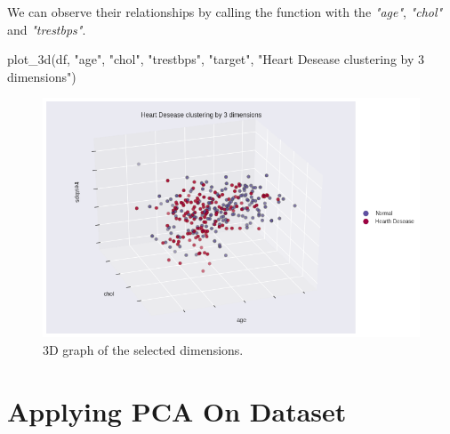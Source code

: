 \documentclass[12pt]{article}
\begin{document}
We can observe their relationships by calling the function with the \textit{"age"}, \textit{"chol"} and \textit{"trestbps"}.

\begin{python}
    plot_3d(df, "age", "chol", "trestbps", "target", "Heart Desease clustering by 3 dimensions")
\end{python}

\begin{figure}[H]
    \centering
    \includegraphics[width=\textwidth]{img/3d-selected.png}
    \caption{3D graph of the selected dimensions.}
\end{figure}

\section*{Applying PCA On Dataset}



\printbibliography
\end{document}
